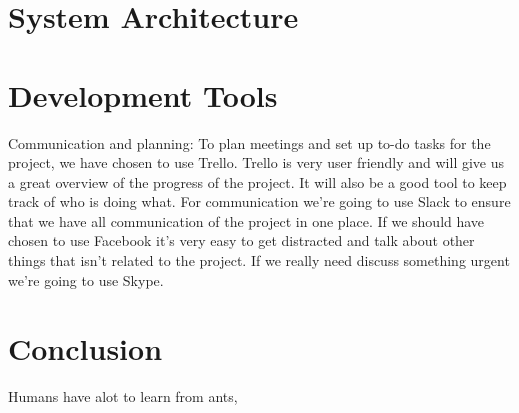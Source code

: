 \documentclass[a4paper]{article}
\begin{document}
\section{System Architecture}

\section{Development Tools}
Communication and planning: To plan meetings and set up to-do tasks for the project, we have chosen to use Trello. Trello is very user friendly and will give us a great overview of the progress of the project. It will also be a good tool to keep track of who is doing what. For communication we’re going to use Slack to ensure that we have all communication of the project in one place. If we should have chosen to use Facebook it’s very easy to get distracted and talk about other things that isn’t related to the project. If we really need discuss something urgent we’re going to use Skype.
\section{Conclusion}
Humans have alot to learn from ants, 
\end{document}
